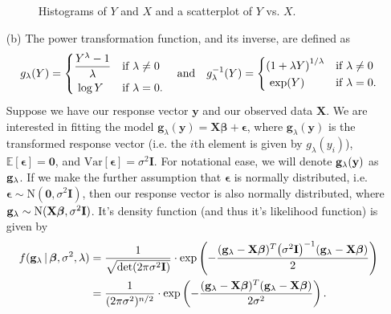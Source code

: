 \documentclass[10pt]{article}
\begin{document}
\begin{itemize}
\begin{figure}[ht]
        \caption{Histograms of \(Y\) and \(X\) and a scatterplot of \(Y\) vs. \(X\).}
        \label{q01-investigation}
    \end{figure}
    \item[(b)] The power transformation function, and its inverse, are defined as 
    \begin{align*}
        g_{\lambda}(Y) 
        = \begin{dcases}
            \frac{Y^{\lambda} - 1}{\lambda} & \text{if } \lambda \neq 0 \\
            ~\log Y & \text{if } \lambda = 0.
        \end{dcases}
        ~~~\text{and}~~~
        g_{\lambda}^{-1}(Y) 
        = \begin{dcases}
            \left( 1 + \lambda Y \right)^{1 / \lambda} & \text{if } \lambda \neq 0 \\
            ~\mathrm{exp}(Y) & \text{if } \lambda = 0.
        \end{dcases}
    \end{align*}
    Suppose we have our response vector \(\mathbf{y}\) and our observed data \(\mathbf{X}\). 
    We are interested in fitting the model \(\mathbf{g}_{\lambda}(\mathbf{y}) = \mathbf{X}\bm{\beta} + \bm{\epsilon}\), where \(\mathbf{g}_{\lambda}(\mathbf{y})\)
    is the transformed response vector (i.e. the \(i\)th element is given by \(g_{\lambda}(y_i)\)), \(\mathbb{E}[\bm{\epsilon}] = \mathbf{0}\), and 
    \(\mathrm{Var}[\bm{\epsilon}] = \sigma^2 \mathbf{I}\). 
    For notational ease, we will denote \(\mathbf{g}_{\lambda}(\mathbf{y})\) as \(\mathbf{g}_{\lambda}\). 
    If we make the further assumption that \(\bm{\epsilon}\) is normally distributed, i.e. 
    \(\bm{\epsilon} \sim \mathrm{N}(\mathbf{0}, \sigma^2 \mathbf{I})\), then our response vector is also normally distributed, where
    \(\mathbf{g}_{\lambda} \sim \mathrm{N}(\mathbf{X}\bm{\beta}, \sigma^2 \mathbf{I})\). It's density function (and thus it's likelihood function) is given by 
    \begin{align*}
        f(\myg \,|\, \bm{\beta}, \sigma^2, \lambda)
        &= \frac{1}{\sqrt{\mathrm{det}(2 \pi \sigma^2 \mathbf{I})}} \cdot \mathrm{exp} \left( - \frac{(\myg - \mathbf{X}\bm{\beta})^T \big( \sigma^2 \mathbf{I} \big)^{-1} (\myg - \mathbf{X}\bm{\beta})}{2} \right) \\
        &= \frac{1}{(2\pi\sigma^2)^{n/2}} \cdot \mathrm{exp} \left( - \frac{(\myg - \mathbf{X}\bm{\beta})^T (\myg - \mathbf{X}\bm{\beta})}{2 \sigma^2} \right).

\end{align*}
\end{itemize}
\end{document}
